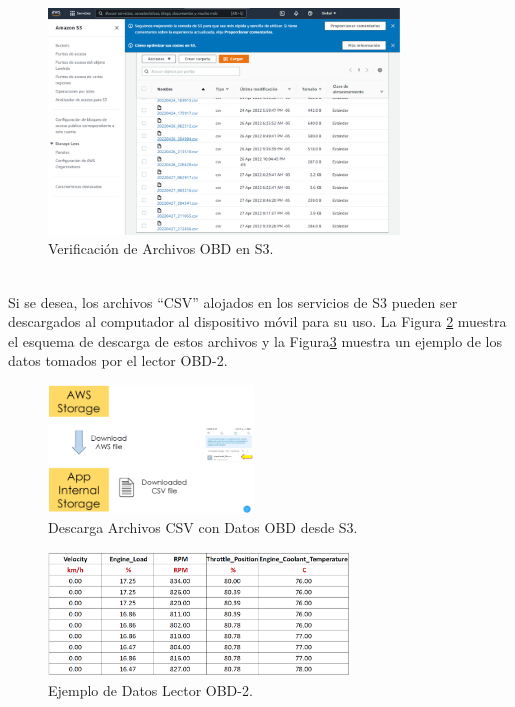 \documentclass[a4paper,10pt, oneside, titlepage]{article}
\begin{document}
	\begin{figure}[!h]
		\centering
		\includegraphics[width = 1\linewidth, height = 6cm]{Verificacion_Archivo_OBD_S3.png}
		\caption{Verificación de Archivos OBD en S3.}
		\label{Verificacion_Archivo_OBD_S3}
	\end{figure} \\
	\indent Si se desea, los archivos ``CSV'' alojados en los servicios de S3 pueden ser descargados al computador al dispositivo móvil para su uso. La Figura \ref{Descarga_CSV_OBD_S3} muestra el esquema de descarga de estos archivos y la Figura\ref{Ejemplo_Datos_OBD} muestra un ejemplo de los datos tomados por el lector OBD-2. 
	\begin{figure}[!h]
		\centering
		\includegraphics[width = 1\linewidth, height = 3.4cm]{Descarga_CSV_OBD_S3.png}
		\caption{Descarga Archivos CSV con Datos OBD desde S3.}
		\label{Descarga_CSV_OBD_S3}
	\end{figure}
	\begin{figure}[!h]
		\centering
		\includegraphics[width = 1\linewidth, height = 3.3cm]{Ejemplo_Datos_OBD.png}
		\caption{Ejemplo de Datos Lector OBD-2.}
		\label{Ejemplo_Datos_OBD}
	\end{figure}
	
\end{document}
